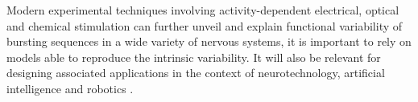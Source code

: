 Modern experimental techniques involving activity-dependent electrical, optical and chemical stimulation can further unveil and explain functional variability of bursting sequences in a wide variety of nervous systems, it is important to rely on models able to reproduce the intrinsic variability. It will also be relevant for designing associated applications in the context of neurotechnology, artificial intelligence and robotics \parencite{garrido-pena_exploring_2024}. 

%


